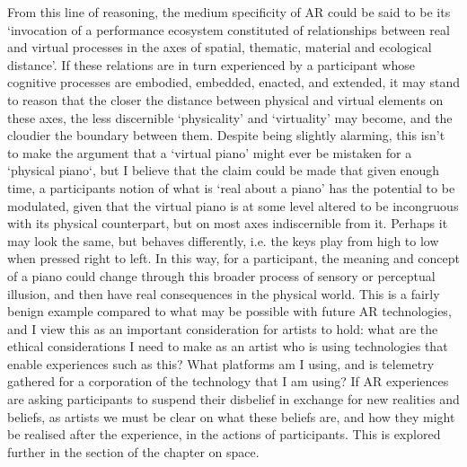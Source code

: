 From this line of reasoning, the medium specificity of AR could be said to be its `invocation of a performance ecosystem constituted of relationships between real and virtual processes in the axes of spatial, thematic, material and ecological distance'. If these relations are in turn experienced by a participant whose cognitive processes are embodied, embedded, enacted, and extended, it may stand to reason that the closer the distance between physical and virtual elements on these axes, the less discernible `physicality' and `virtuality' may become, and the cloudier the boundary between them. Despite being slightly alarming, this isn't to make the argument that a `virtual piano' might ever be mistaken for a `physical piano`, but I believe that the claim could be made that given enough time, a participants notion of what is `real about a piano' has the potential to be modulated, given that the virtual piano is at some level altered to be incongruous with its physical counterpart, but on most axes indiscernible from it. Perhaps it may look the same, but behaves differently, i.e. the keys play from high to low when pressed right to left. In this way, for a participant, the meaning and concept of a piano could change through this broader process of sensory or perceptual illusion, and then have real consequences in the physical world. This is a fairly benign example compared to what may be possible with future AR technologies, and I view this as an important consideration for artists to hold: what are the ethical considerations I need to make as an artist who is using technologies that enable experiences such as this? What platforms am I using, and is telemetry gathered for a corporation of the technology that I am using? If AR experiences are asking participants to suspend their disbelief in exchange for new realities and beliefs, as artists we must be clear on what these beliefs are, and how they might be realised after the experience, in the actions of participants. This is explored further in the section of the chapter on space.

